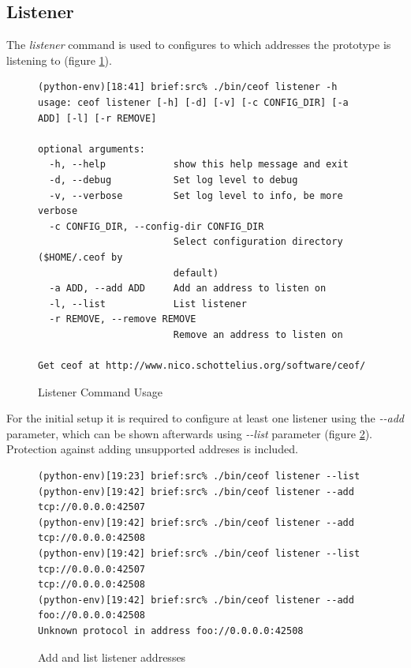 \subsection{Listener}
The \textit{listener} command is used
to configures to which addresses the prototype is listening to (figure
\ref{listenerusage}).
\begin{figure}[htbp]
\caption{Listener Command Usage}
\label{listenerusage}
\begin{verbatim}
(python-env)[18:41] brief:src% ./bin/ceof listener -h
usage: ceof listener [-h] [-d] [-v] [-c CONFIG_DIR] [-a ADD] [-l] [-r REMOVE]

optional arguments:
  -h, --help            show this help message and exit
  -d, --debug           Set log level to debug
  -v, --verbose         Set log level to info, be more verbose
  -c CONFIG_DIR, --config-dir CONFIG_DIR
                        Select configuration directory ($HOME/.ceof by
                        default)
  -a ADD, --add ADD     Add an address to listen on
  -l, --list            List listener
  -r REMOVE, --remove REMOVE
                        Remove an address to listen on

Get ceof at http://www.nico.schottelius.org/software/ceof/
\end{verbatim}
\end{figure}
For the initial setup it is required to configure at least one listener
using the \textit{-{}-add} parameter, which can be shown afterwards using
\textit{-{}-list} parameter (figure \ref{addandlistlistener}). 
Protection against adding unsupported addreses is included.
\begin{figure}[htbp][htb]
\caption{Add and list listener addresses}
\label{addandlistlistener}
\begin{verbatim}
(python-env)[19:23] brief:src% ./bin/ceof listener --list
(python-env)[19:42] brief:src% ./bin/ceof listener --add tcp://0.0.0.0:42507
(python-env)[19:42] brief:src% ./bin/ceof listener --add tcp://0.0.0.0:42508
(python-env)[19:42] brief:src% ./bin/ceof listener --list                   
tcp://0.0.0.0:42507
tcp://0.0.0.0:42508
(python-env)[19:42] brief:src% ./bin/ceof listener --add foo://0.0.0.0:42508 
Unknown protocol in address foo://0.0.0.0:42508
\end{verbatim}
\end{figure}
